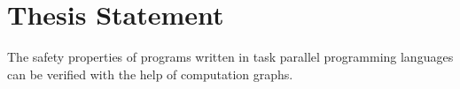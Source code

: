 \section{Thesis Statement}
The safety properties of programs written in task parallel programming languages can be verified with the help of computation graphs.